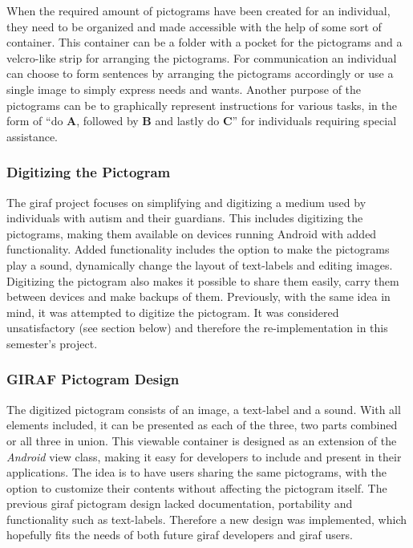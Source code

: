 When the required amount of pictograms have been created for an individual, they need to be organized and made accessible with the help of some sort of container. This container can be a folder with a pocket for the pictograms and a velcro-like strip for arranging the pictograms. For communication an individual can choose to form sentences by arranging the pictograms accordingly or use a single image to simply express needs and wants. Another purpose of the pictograms can be to graphically represent instructions for various tasks, in the form of ``do \textbf{A}, followed by \textbf{B} and lastly do \textbf{C}'' for individuals requiring special assistance.

\subsubsection*{Digitizing the Pictogram}
The \ac{giraf} project focuses on simplifying and digitizing a medium used by individuals with autism and their guardians. This includes digitizing the pictograms, making them available on devices running Android with added functionality. Added functionality includes the option to make the pictograms play a sound, dynamically change the layout of text-labels and editing images. Digitizing the pictogram also makes it possible to share them easily, carry them between devices and make backups of them. Previously, with the same idea in mind, it was attempted to digitize the pictogram. It was considered unsatisfactory (see section below) and therefore the re-implementation in this semester's project.

\subsubsection*{GIRAF Pictogram Design}
The digitized pictogram consists of an image, a text-label and a sound. With all elements included, it can be presented as each of the three, two parts combined or all three in union. This viewable container is designed as an extension of the \emph{Android} view class, making it easy for developers to include and present in their applications. The idea is to have users sharing the same pictograms, with the option to customize their contents without affecting the pictogram itself. The previous \ac{giraf} pictogram design lacked documentation, portability and functionality such as text-labels. Therefore a new design was implemented, which hopefully fits the needs of both future \ac{giraf} developers and \ac{giraf} users.
